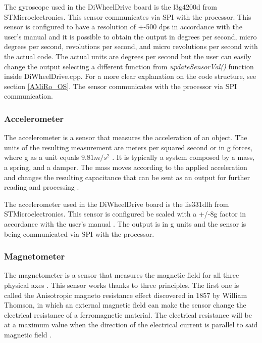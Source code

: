 \documentclass[12pt]{report}%
\begin{document}
The gyroscope used in the DiWheelDrive board is the l3g4200d from STMicroelectronics. This sensor communicates via SPI with the processor. This sensor is configured to have a resolution of +-500 dps in accordance with the user's manual \cite{gyroscopepart} and it is possible to obtain the output in degrees per second, micro degrees per second, revolutions per second, and micro revolutions per second with the actual code. The actual units are degrees per second but the user can easily change the output selecting a different function from \textit{updateSensorVal()} function inside DiWheelDrive.cpp. For a more clear explanation on the code structure, see section \ref{AMiRo_OS}. The sensor communicates with the processor via SPI communication.

\subsubsection{Accelerometer}
The accelerometer is a sensor that measures the acceleration of an object. The units of the resulting measurement are meters per squared second or in g forces, where g as a unit equals $9.81 m/s^2$ \cite{accelerometertheory}. It is typically a system composed by a mass, a spring, and a damper. The mass moves according to the applied acceleration and changes the resulting capacitance that can be sent as an output for further reading and processing \cite{AMiRo_ppt_v1}.

The accelerometer used in the DiWheelDrive board is the lis331dlh from STMicroelectronics. This sensor is configured be scaled with a +/-8g factor in accordance with the user's manual \cite{accelerometerpart}. The output is in g units and the sensor is being communicated via SPI with the processor.

\subsubsection{Magnetometer}
The magnetometer is a sensor that measures the magnetic field for all three physical axes \cite{magnetometertheory}. This sensor works thanks to three principles. The first one is called the Anisotropic magneto resistance effect discovered in 1857 by William Thomson, in which an external magnetic field can make the sensor change the electrical resistance of a ferromagnetic material. The electrical resistance will be at a maximum value when the direction of the electrical current is parallel to said magnetic field \cite{AMiRo_ppt_v1}.
\end{document}
